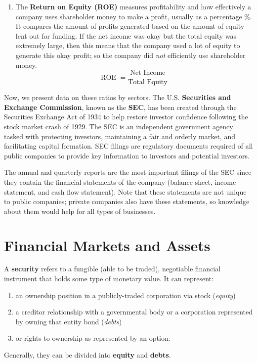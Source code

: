 \documentclass{article}
\begin{document}
\begin{enumerate}
      \item The \textbf{Return on Equity (ROE)} measures profitability and how effectively a company uses shareholder money to make a profit, usually as a percentage \%. It compares the amount of profits generated based on the amount of equity lent out for funding. If the net income was okay but the total equity was extremely large, then this means that the company used a lot of equity to generate this okay profit; so the company did \textit{not} efficiently use shareholder money.
      \begin{equation}
        \text{ROE } = \frac{\text{Net Income}}{\text{Total Equity}}
      \end{equation}
    \end{enumerate}

    Now, we present data on these ratios by sectors. The U.S. \textbf{Securities and Exchange Commission}, known as the \textbf{SEC}, has been created through the Securities Exchange Act of 1934 to help restore investor confidence following the stock market crash of 1929. The SEC is an independent government agency tasked with protecting investors, maintaining a fair and orderly market, and facilitating capital formation. SEC filings are regulatory documents required of all public companies to provide key information to investors and potential investors.

    The annual and quarterly reports are the most important filings of the SEC since they contain the financial statements of the company (balance sheet, income statement, and cash flow statement). Note that these statements are not unique to public companies; private companies also have these statements, so knowledge about them would help for all types of businesses.

\section{Financial Markets and Assets}

  \begin{definition}[Securities]
    A \textbf{security} refers to a fungible (able to be traded), negotiable financial instrument that holds some type of monetary value. It can represent: 
    \begin{enumerate}
        \item an ownership position in a publicly-traded corporation via stock (\textit{equity})
        \item a creditor relationship with a governmental body or a corporation represented by owning that entity bond (\textit{debts})
        \item or rights to ownership as represented by an option. 
    \end{enumerate}
    Generally, they can be divided into \textbf{equity} and \textbf{debts}. 
  \end{definition}
\end{document}
